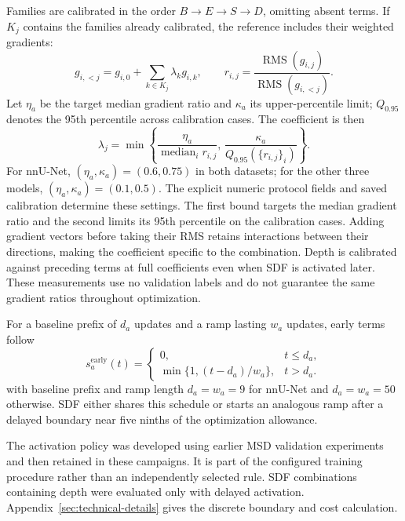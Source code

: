 \documentclass[12pt,a4paper]{article}
\begin{document}
Families are calibrated in the order $B\to E\to S\to D$, omitting
absent terms. If $K_j$ contains the families already calibrated, the
reference includes their weighted gradients:
\begin{equation}
g_{i,<j}=g_{i,0}+\sum_{k\in K_j}\lambda_k g_{i,k},
\qquad
r_{i,j}=\frac{\operatorname{RMS}(g_{i,j})}
                  {\operatorname{RMS}(g_{i,<j})}.
\label{eq:sequential-calibration-ratio}
\end{equation}
Let $\eta_a$ be the target median gradient ratio and $\kappa_a$ its
upper-percentile limit; $Q_{0.95}$ denotes the 95th percentile across
calibration cases. The coefficient is then
\begin{equation}
\lambda_j=
\min\left\{
\frac{\eta_a}{\operatorname{median}_i r_{i,j}},\,
\frac{\kappa_a}{Q_{0.95}(\{r_{i,j}\}_i)}
\right\}.
\label{eq:constraint-calibrated-coefficient}
\end{equation}
For nnU-Net, $(\eta_a,\kappa_a)=(0.6,0.75)$ in both datasets;
for the other three models, $(\eta_a,\kappa_a)=(0.1,0.5)$. The explicit
numeric protocol fields and saved calibration determine these settings.
The first bound targets the median gradient ratio and the second
limits its 95th percentile on the calibration cases. Adding gradient vectors
before taking their RMS retains interactions between their directions,
making the coefficient specific to the combination. Depth is calibrated
against preceding terms at full coefficients even when SDF is activated
later. These measurements use no validation labels and do not guarantee
the same gradient ratios throughout optimization.

For a baseline prefix of $d_a$ updates and a ramp lasting $w_a$ updates,
early terms follow
\begin{equation}
s_a^{\mathrm{early}}(t)=
\begin{cases}
0, & t\leq d_a,\\
\min\{1,(t-d_a)/w_a\}, & t>d_a.
\end{cases}
\label{eq:constraint-early-ramp}
\end{equation}
with baseline prefix and ramp length $d_a=w_a=9$ for nnU-Net and
$d_a=w_a=50$ otherwise. SDF either shares this schedule or starts an
analogous ramp after a delayed boundary near five ninths of the
optimization allowance.


The activation policy was developed using earlier MSD validation
experiments and then retained in these campaigns. It is part of the
configured training procedure rather than an independently selected rule. SDF
combinations containing depth were evaluated only with delayed activation.
Appendix~\ref{sec:technical-details} gives the discrete boundary and
cost calculation.
\end{document}
